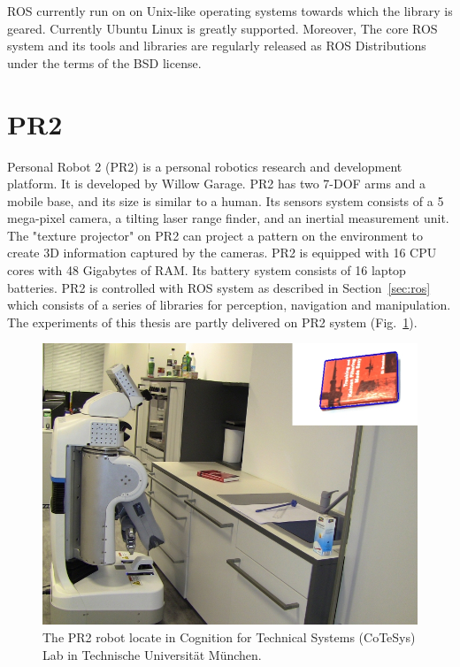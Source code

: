 ROS currently run on on Unix-like operating systems towards which the library is
geared. Currently Ubuntu Linux is greatly supported. Moreover, The core
ROS system and its tools and libraries are regularly released as ROS
Distributions~\cite{rosintroduction} under the terms of the BSD license.

\section{PR2}
\label{sec:pr2}
Personal Robot 2 (PR2) is a personal robotics research and development
platform.  It is developed by Willow Garage.  PR2 has two 7-DOF arms and a mobile
base, and its size  is similar to a human. Its sensors system consists of a 5
mega-pixel camera, a tilting laser range finder, and an inertial
measurement unit. The "texture projector" on PR2 can project a pattern
on the environment to create 3D information captured by the
cameras. PR2 is equipped with 16 CPU cores with 48 Gigabytes of
RAM. Its battery system consists of 16 laptop batteries. PR2 is
controlled with ROS system as described in Section~\ref{sec:ros} which
consists of a series of libraries for perception, navigation and
manipulation.
The experiments of this thesis are partly delivered on PR2 system (Fig.~\ref{fig:pr2}).

\begin{figure}[htbp]
  \centering
\includegraphics[width=\linewidth]{images/pr2.jpg}
  \caption[A PR2 robot]{The PR2 robot locate in Cognition for
    Technical Systems (CoTeSys) Lab in Technische Universit\"at M\"unchen.}
  \label{fig:pr2}
\end{figure}

